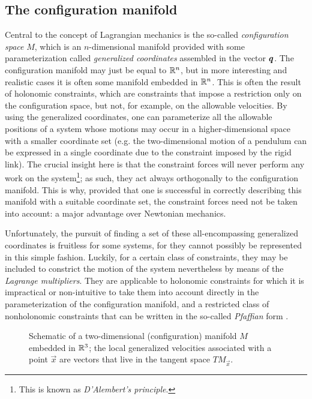 \subsection{The configuration manifold}
Central to the concept of Lagrangian mechanics is the so-called \emph{configuration space} \(M\), which is an \(n\)-dimensional manifold provided with some parameterization called \emph{generalized coordinates} assembled in the vector \(\vb*{q}\). 
The configuration manifold may just be equal to \(\mathbb{R}^n\), but in more interesting and realistic cases it is often some manifold embedded in \(\mathbb{R}^n\). This is often the result of holonomic constraints, which are constraints that impose a restriction only on the configuration space, but not, for example, on the allowable velocities.
By using the generalized coordinates, one can parameterize all the allowable positions of a system whose motions may occur in a higher-dimensional space with a smaller coordinate set (e.g. the two-dimensional motion of a pendulum can be expressed in a single coordinate due to the constraint imposed by the rigid link).  The crucial insight here is that the constraint forces will never perform any work on the system\footnote{This is known as \emph{D'Alembert's principle}.}; as such, they act always orthogonally to the configuration manifold. This is why, provided that one is successful in correctly describing this manifold with a suitable coordinate set, the constraint forces need not be taken into account: a  major advantage over Newtonian mechanics. 

Unfortunately, the pursuit of finding a set of these all-encompassing generalized coordinates is fruitless for some systems, for they cannot possibly be represented in this simple fashion. Luckily, for a certain class of constraints, they may be included to constrict the motion of the system nevertheless by means of the \emph{Lagrange multipliers}. They are applicable to holonomic constraints for which it is impractical or non-intuitive to take them into account directly in the parameterization of the configuration manifold, and a restricted class of nonholonomic constraints that can be written in the so-called \emph{Pfaffian} form \cite{Bullo2005}.

\begin{figure}[ht]
    \centering
    
    \caption{Schematic of a two-dimensional (configuration) manifold $M$ embedded in $\mathbb{R}^3$; the local generalized velocities associated with a point $\vec{x}$ are vectors that live in the tangent space $TM_{\vec{x}}$.}
    \label{fig:conf_mnfold}
\end{figure}

